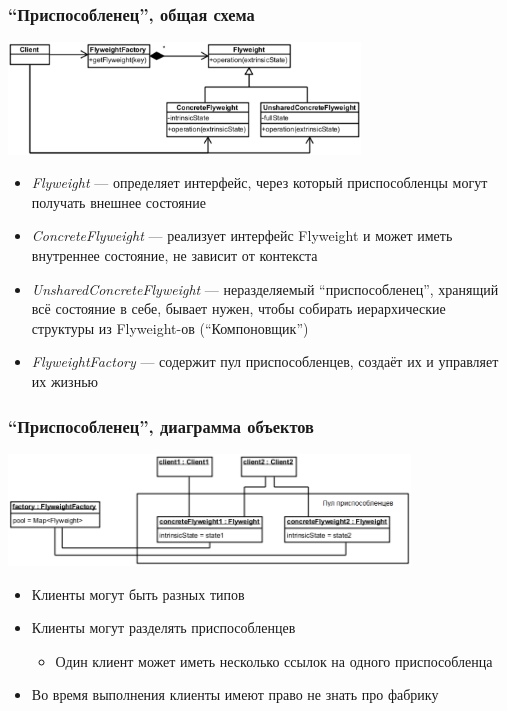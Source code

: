 \documentclass{../../slides-style}
\begin{document}
    \begin{frame}
        \frametitle{``Приспособленец'', общая схема}
        \begin{center}
            \includegraphics[width=0.7\textwidth]{flyweight.png}
        \end{center}
        \begin{footnotesize}
            \begin{itemize}
                \item \textit{Flyweight} --- определяет интерфейс, через который приспособленцы могут получать внешнее состояние
                \item \textit{ConcreteFlyweight} --- реализует интерфейс Flyweight и может иметь внутреннее состояние, не зависит от контекста
                \item \textit{UnsharedConcreteFlyweight} --- неразделяемый ``приспособленец'', хранящий всё состояние в себе, бывает нужен, чтобы собирать иерархические структуры из Flyweight-ов (``Компоновщик'')
                \item \textit{FlyweightFactory} --- содержит пул приспособленцев, создаёт их и управляет их жизнью
            \end{itemize}
        \end{footnotesize}
    \end{frame}

    \begin{frame}
        \frametitle{``Приспособленец'', диаграмма объектов}
        \begin{center}
            \includegraphics[width=0.8\textwidth]{flyweightObjects.png}
        \end{center}
        \begin{itemize}
            \item Клиенты могут быть разных типов
            \item Клиенты могут разделять приспособленцев
            \begin{itemize}
                \item Один клиент может иметь несколько ссылок на одного приспособленца
            \end{itemize}
            \item Во время выполнения клиенты имеют право не знать про фабрику
        \end{itemize}
    \end{frame}
\end{document}
